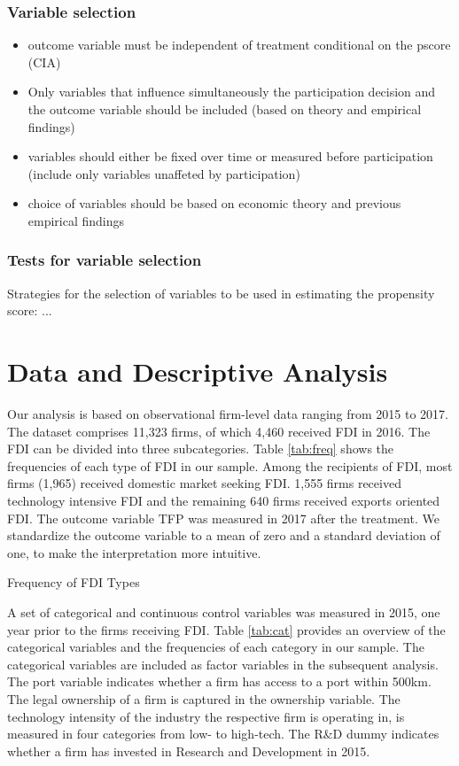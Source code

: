 \documentclass[a4paper,11pt]{scrartcl}
\begin{document}
{\subsubsection*{Variable selection}
\begin{itemize}
\item outcome variable must be independent of treatment conditional on the pscore (CIA)
\item Only variables that influence simultaneously the participation decision and the outcome variable should be included (based on theory and empirical findings)
\item variables should either be fixed over time or measured before participation (include only variables unaffeted by participation)
\item choice of variables should be based on economic theory and previous empirical findings
\end{itemize}

\subsubsection*{Tests for variable selection}
Strategies for the selection of variables to be used in estimating the propensity score: ...
}

\section{Data and Descriptive Analysis}
Our analysis is based on observational firm-level data ranging from 2015 to 2017. The dataset comprises 11,323 firms, of which 4,460 received FDI in 2016. The FDI can be divided into three subcategories. Table \ref{tab:freq} shows the frequencies of each type of FDI in our sample. Among the recipients of FDI, most firms (1,965) received domestic market seeking FDI. 1,555 firms received technology intensive FDI and the remaining 640 firms received exports oriented FDI. The outcome variable TFP was measured in 2017 after the treatment. We standardize the outcome variable to a mean of zero and a standard deviation of one, to make the interpretation more intuitive. 

\begin{table}[h]
	\centering
	\caption{Frequency of FDI Types} 
	
\label{tab:freq}
\end{table}

A set of categorical and continuous control variables was measured in 2015, one year prior to the firms receiving FDI. Table \ref{tab:cat} provides an overview of the categorical variables and the frequencies of each category in our sample. The categorical variables are included as factor variables in the subsequent analysis. The port variable indicates whether a firm has access to a port within 500km. The legal ownership of a firm is captured in the ownership variable. The technology intensity of the industry the respective firm is operating in, is measured in four categories from low- to high-tech. The R\&D dummy indicates whether a firm has invested in Research and Development in 2015. \\
\end{document}
